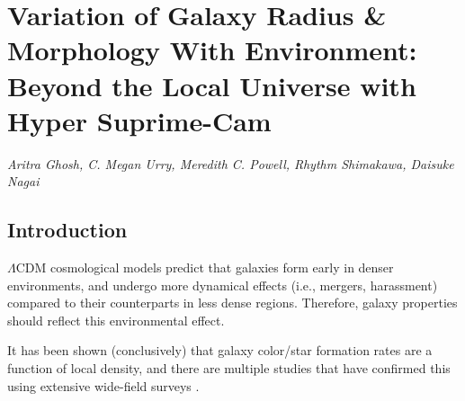\chapter{Variation of Galaxy Radius \& Morphology With Environment: Beyond the Local Universe with Hyper Suprime-Cam} \label{chap:morph_den}


{\large \emph{Aritra Ghosh, C. Megan Urry, Meredith C. Powell, Rhythm Shimakawa, Daisuke Nagai}} 


\section{Introduction} \label{sec_c4:intro}

$\Lambda$CDM cosmological models predict that galaxies form early in denser environments, and undergo more dynamical effects (i.e., mergers, harassment) compared to their counterparts in less dense regions. Therefore, galaxy properties should reflect this environmental effect.

It has been shown (conclusively) that galaxy color/star formation rates are a function of local density, and there are multiple studies that have confirmed this using extensive wide-field surveys \citep[e.g.,][]{Kauffmann04, Blanton05, Tanaka05, baldly_06, Peng10, Wetzel12, Alpaslan15, Duarte18, Old20}.


